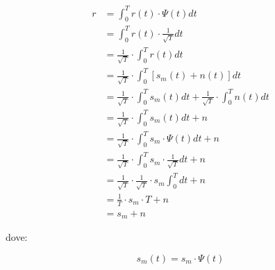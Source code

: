 {
    \Large
    \begin{equation}
        \begin{split}
            r 
            &= 
            \int_{0}^{T}
            r(t) \cdot \Psi(t) dt 
            \\
            &=
            \int_{0}^{T}
            r(t) \cdot \frac{1}{\sqrt{T}} dt
            \\
            &=
            \frac{1}{\sqrt{T}}
            \cdot 
            \int_{0}^{T}
            r(t) dt
            \\
            &= 
            \frac{1}{\sqrt{T}}
            \cdot 
            \int_{0}^{T}
            \left[
                s_{m} (t) 
                + 
                n(t)
            \right]
            dt
            \\
            &=
            \frac{1}{\sqrt{T}}
            \cdot 
            \int_{0}^{T}
            s_{m} (t)
            dt 
            + 
            \frac{1}{\sqrt{T}}
            \cdot 
            \int_{0}^{T}
            n(t)
            dt
            \\ 
            &=  
            \frac{1}{\sqrt{T}}
            \cdot 
            \int_{0}^{T}
            s_{m} (t)
            dt 
            + 
            n
            \\
            &= 
            \frac{1}{\sqrt{T}}
            \cdot 
            \int_{0}^{T}
            s_{m} \cdot \Psi (t)
            dt 
            + 
            n
            \\
            &= 
            \frac{1}{\sqrt{T}}
            \cdot 
            \int_{0}^{T}
            s_{m} \cdot \frac{1}{\sqrt{T}}
            dt 
            + 
            n
            \\
             &= 
            \frac{1}{\sqrt{T}} 
            \cdot
            \frac{1}{\sqrt{T}}
            \cdot 
            s_{m}
            \int_{0}^{T} 
            dt 
            + 
            n
            \\
            &= 
            \frac{1}{T}
            \cdot 
            s_m
            \cdot 
            T
            + 
            n
            \\
            &= 
            s_m + n
        \end{split}
    \end{equation}
}

dove: 

{
    \Large 
    \begin{equation}
        s_m (t) = s_m \cdot \Psi (t)
    \end{equation}
}

